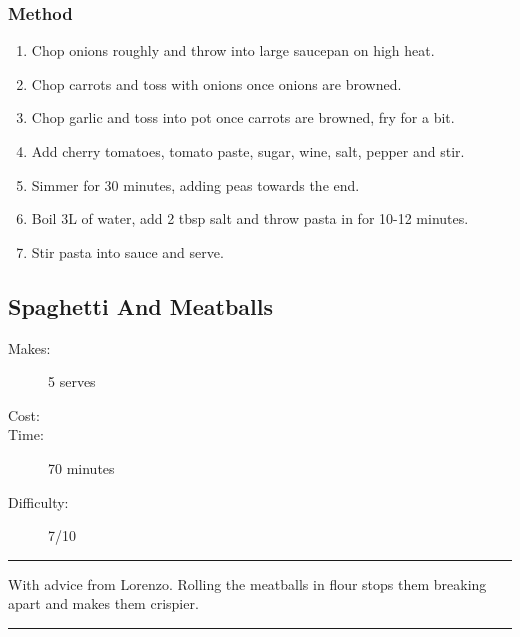 \documentclass[]{article}
\begin{document}
\subsubsection*{\Large Method}
\begin{enumerate}[font=\huge\color{accent}]
	\item Chop onions roughly and throw into large saucepan on high heat.
	\item Chop carrots and toss with onions once onions are browned.
	\item Chop garlic and toss into pot once carrots are browned, fry for a bit.
	\item Add cherry tomatoes, tomato paste, sugar, wine, salt, pepper and stir.
	\item Simmer for 30 minutes, adding peas towards the end.
	\item Boil 3L of water, add 2 tbsp salt and throw pasta in for 10-12 minutes.
	\item Stir pasta into sauce and serve.
\end{enumerate}
\newpage
{}\label{rec:Spaghetti And Meatballs}
\subsection*{\center\huge Spaghetti And Meatballs}
\begin{description}
\item[Makes:] 5 serves
\item[Cost:] \textdollar
\item[Time:] 70 minutes
\item[Difficulty:] 7/10
\end{description}
\vspace{0.2cm}\hrule\vspace{0.5cm}
\begin{adjustwidth}{0.5 cm}{0.5 cm}

With advice from Lorenzo. Rolling the meatballs in flour stops them breaking apart and makes them crispier. \hfill{}\color{black}

\end{adjustwidth}
\vspace{0.5cm}\hrule
\end{document}
